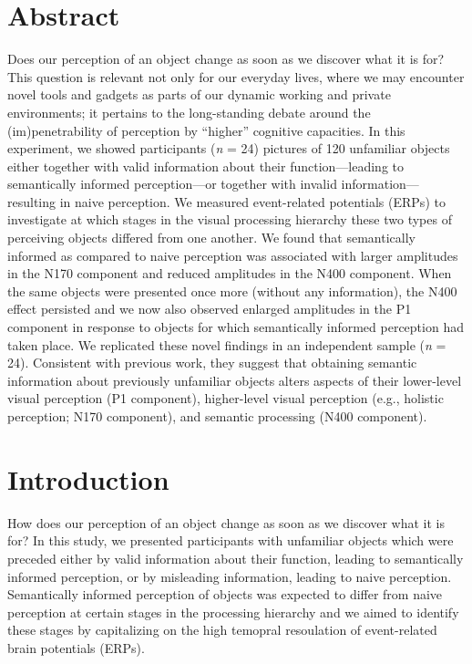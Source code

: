 \documentclass[
  english,
  doc,12pt,twoside,floatsintext]{apa7}
\begin{document}
\setcounter{page}{1}

\hypertarget{abstract}{%
\section*{Abstract}\label{abstract}}

Does our perception of an object change as soon as we discover what it is for? This question is relevant not only for our everyday lives, where we may encounter novel tools and gadgets as parts of our dynamic working and private environments; it pertains to the long-standing debate around the (im)penetrability of perception by ``higher'' cognitive capacities. In this experiment, we showed participants (\emph{n} = 24) pictures of 120 unfamiliar objects either together with valid information about their function---leading to semantically informed perception---or together with invalid information---resulting in naive perception. We measured event-related potentials (ERPs) to investigate at which stages in the visual processing hierarchy these two types of perceiving objects differed from one another. We found that semantically informed as compared to naive perception was associated with larger amplitudes in the N170 component and reduced amplitudes in the N400 component. When the same objects were presented once more (without any information), the N400 effect persisted and we now also observed enlarged amplitudes in the P1 component in response to objects for which semantically informed perception had taken place. We replicated these novel findings in an independent sample (\emph{n} = 24). Consistent with previous work, they suggest that obtaining semantic information about previously unfamiliar objects alters aspects of their lower-level visual perception (P1 component), higher-level visual perception (e.g., holistic perception; N170 component), and semantic processing (N400 component).

\newpage

\hypertarget{introduction}{%
\section{Introduction}\label{introduction}}

How does our perception of an object change as soon as we discover what it is for? In this study, we presented participants with unfamiliar objects which were preceded either by valid information about their function, leading to semantically informed perception, or by misleading information, leading to naive perception. Semantically informed perception of objects was expected to differ from naive perception at certain stages in the processing hierarchy and we aimed to identify these stages by capitalizing on the high temopral resoulation of event-related brain potentials (ERPs).
\end{document}
